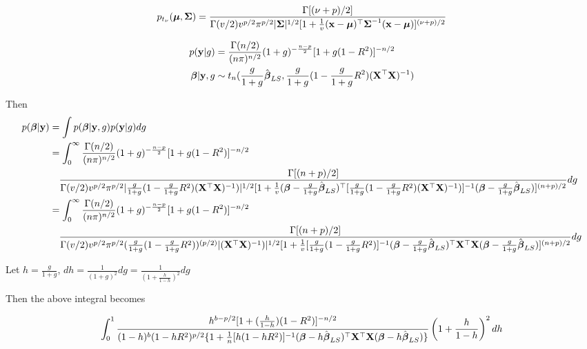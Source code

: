 \documentclass{amsart}[12pt]
\begin{document}
\begin{equation}
	p_{t_\nu}({\boldsymbol \mu}, {\boldsymbol \Sigma}) = \frac{\Gamma[(\nu + p)/2]}{\Gamma(v/2) v^{p/2} \pi^{p/2} |{\boldsymbol \Sigma}|^{1/2} [1 + \frac{1}{v}({\bf x} - {\boldsymbol \mu})^\top {\boldsymbol\Sigma}^{-1} ({\bf x} - {\boldsymbol \mu})]^{(\nu + p)/2}}
\end{equation}

\begin{align*}
p({\bf y} | g) &= \frac{\Gamma(n/2)}{(n \pi)^{n/2}} (1 + g)^{-\frac{n - p}{2}} [1 + g(1 - R^2)]^{-n/2} \\
{\boldsymbol \beta} | {\bf y}, g &\sim t_n(\frac{g}{1 + g} \hat{{\boldsymbol \beta}}_{LS}, \frac{g}{1 + g} (1 - \frac{g}{1 + g} R^2) ({\bf X}^\top {\bf X})^{-1}) \\
\end{align*}

Then
\small
\begin{align*}
p({\boldsymbol \beta} | {\bf y}) &= \int p({\boldsymbol \beta} | {\bf y}, g) p({\bf y} | g) dg \\
&= \int_0^\infty \frac{\Gamma(n/2)}{(n \pi)^{n/2}} (1 + g)^{-\frac{n - p}{2}} [1 + g(1 - R^2)]^{-n/2} \\
&\quad \frac{\Gamma[(n + p)/2]}{\Gamma(v/2) v^{p/2} \pi^{p/2} |\frac{g}{1 + g} (1 - \frac{g}{1 + g} R^2) ({\bf X}^\top {\bf X})^{-1})|^{1/2} [1 + \frac{1}{v}({\boldsymbol \beta} - \frac{g}{1 + g} \hat{{\boldsymbol \beta}}_{LS})^\top [\frac{g}{1 + g} (1 - \frac{g}{1 + g} R^2) ({\bf X}^\top {\bf X})^{-1})]^{-1} ({\boldsymbol \beta} - \frac{g}{1 + g} \hat{{\boldsymbol \beta}}_{LS})]^{(n + p)/2}} dg \\
&= \int_0^\infty \frac{\Gamma(n/2)}{(n \pi)^{n/2}} (1 + g)^{-\frac{n - p}{2}} [1 + g(1 - R^2)]^{-n/2} \\
&\quad \frac{\Gamma[(n + p)/2]}{\Gamma(v/2) v^{p/2} \pi^{p/2} (\frac{g}{1 + g} (1 - \frac{g}{1 + g} R^2))^{(p/2)} |({\bf X}^\top {\bf X})^{-1})|^{1/2} [1 + \frac{1}{v} [\frac{g}{1 + g} (1 - \frac{g}{1 + g} R^2)]^{-1}({\boldsymbol \beta} - \frac{g}{1 + g} \hat{{\boldsymbol \beta}}_{LS})^\top {\bf X}^\top {\bf X} ({\boldsymbol \beta} - \frac{g}{1 + g} \hat{{\boldsymbol \beta}}_{LS})]^{(n + p)/2}} dg \\
\end{align*}

Let $h = \frac{g}{1 + g}$, $dh = \frac{1}{(1 + g)^2} dg = \frac{1}{\left(1 + \frac{h}{1 - h}\right)^2} dg$

Then the above integral becomes

\begin{align*}
\int_0^1 \frac{h^{b - p/2} [1 + (\frac{h}{1 - h})(1 - R^2)]^{-n/2}}{(1 - h)^b (1 - h R^2)^{p/2} \{ 1 + \frac{1}{n}[h(1 - h R^2)]^{-1} ({\boldsymbol \beta} - h \hat{{\boldsymbol \beta}}_{LS})^\top {\bf X}^\top {\bf X} ({\boldsymbol \beta} - h \hat{{\boldsymbol \beta}}_{LS}) \}} \left(1 + \frac{h}{1 - h}\right)^2 dh
\end{align*}
\end{document}
